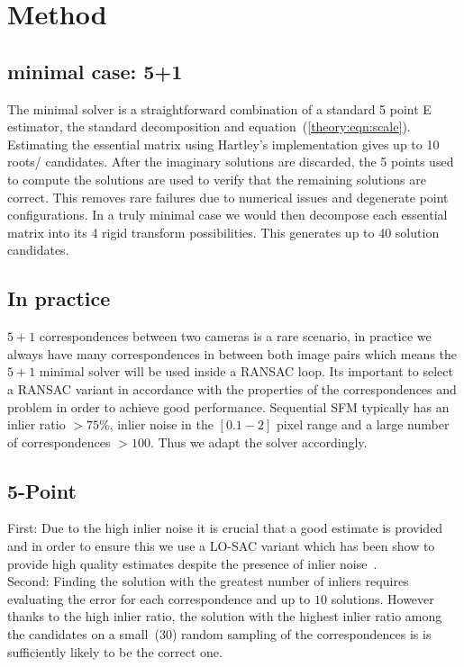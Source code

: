\section{Method}


\subsection{minimal case: 5+1}
The minimal solver is a straightforward combination of a standard 5 point E estimator, the standard decomposition and equation~(\ref{theory:eqn:scale}).  \\

Estimating the essential matrix using Hartley's implementation gives up to 10 roots/ candidates. After the imaginary solutions are discarded, the 5 points used to compute the solutions are used to verify that the remaining solutions are correct. This removes rare failures due to numerical issues and degenerate point configurations. 
In a truly minimal case we would then decompose each essential matrix into its 4 rigid transform possibilities. This generates up to 40 solution candidates. 

\subsection{In practice}
$5+1$ correspondences between two cameras is a rare scenario, in practice we always have many correspondences in between both image pairs which means the $5+1$ minimal solver will be used inside a RANSAC loop. 
Its important to select a RANSAC variant in accordance with the properties of the correspondences and problem in order to achieve good performance.
Sequential SFM typically has an inlier ratio $>75\%$, inlier noise in the $[0.1 - 2]$ pixel range and a large number of correspondences $>100$. Thus we adapt the solver accordingly. \\
\subsection{5-Point}
First: Due to the high inlier noise it is crucial that a good estimate is provided and in order to ensure this we use a LO-SAC variant which has been show to provide high quality estimates despite the presence of inlier noise~\cite{lebeda2012fixing}.\\

Second: Finding the solution with the greatest number of inliers requires evaluating the error for each correspondence and up to $10$ solutions. However thanks to the high inlier ratio, the solution with the highest inlier ratio among the candidates on a small~($30$) random sampling of the correspondences is is sufficiently likely to be the correct one.  \\


